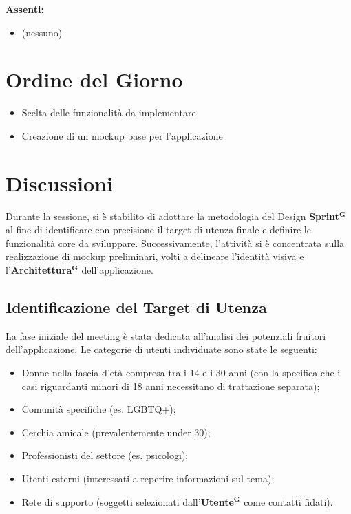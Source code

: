 \documentclass[a4paper,12pt]{article}
\newcommand{\term}[1]{\textbf{#1}$^\mathbf{G}$}
\begin{document}
\textbf{Assenti:}
\begin{itemize}
    \item (nessuno)
\end{itemize}

\clearpage

\vspace{0.5cm}

\vspace{0.8cm}

\clearpage
\tableofcontents
\thispagestyle{empty} %
\clearpage

\section{Ordine del Giorno}
\begin{itemize}
    \item Scelta delle funzionalità da implementare
    \item Creazione di un mockup base per l'applicazione
\end{itemize}

\section{Discussioni}
Durante la sessione, si è stabilito di adottare la metodologia del Design \term{Sprint} al fine di identificare con precisione il target di utenza finale e definire le funzionalità core da sviluppare. Successivamente, l'attività si è concentrata sulla realizzazione di mockup preliminari, volti a delineare l'identità visiva e l'\term{Architettura} dell'applicazione.

\subsection{Identificazione del Target di Utenza}
La fase iniziale del meeting è stata dedicata all'analisi dei potenziali fruitori dell'applicazione. Le categorie di utenti individuate sono state le seguenti:

\begin{itemize}
    \item Donne nella fascia d'età compresa tra i 14 e i 30 anni (con la specifica che i casi riguardanti minori di 18 anni necessitano di trattazione separata);
    \item Comunità specifiche (es. LGBTQ+);
    \item Cerchia amicale (prevalentemente under 30);
    \item Professionisti del settore (es. psicologi);
    \item Utenti esterni (interessati a reperire informazioni sul tema);
    \item Rete di supporto (soggetti selezionati dall'\term{Utente} come contatti fidati).
\end{itemize}
\end{document}
